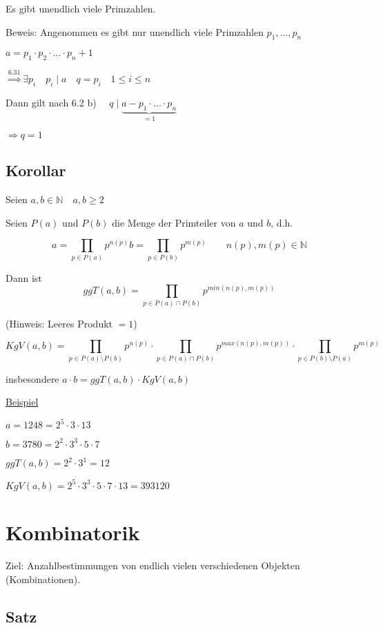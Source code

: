 \documentclass[a4paper, 12pt, twoside] {article}
\begin{document}
Es gibt unendlich viele Primzahlen.

Beweis:	Angenommen es gibt nur unendlich viele Primzahlen $p_1, ..., p_n$

$a = p_1 \cdot p_2 \cdot ... \cdot p_n + 1$

$\overset{6.31}{\Rightarrow} \exists p_i \quad p_i \mid a \quad q = p_i \quad 1 \leq i \leq n$
	
Dann gilt nach 6.2 b) $\quad q \mid \underbrace{a - p_1 \cdot ... \cdot p_n}_{=1}$

$\Rightarrow q = 1$ \Lightning

\subsection{Korollar} %

Seien $a,b \in \mathbb{N} \quad a,b \geq 2$

Seien $P(a)$ und $P(b)$ die Menge der Primteiler von $a$ und $b$, d.h.

$$ a = \prod_{p \in P(a)} p^{n(p)} b = \prod_{p \in P(b)} p^{m(p)}	\qquad n(p), m(p) \in \mathbb{N}$$

Dann ist $$ggT(a,b) = \prod_{p \in P(a) \cap P(b)} p^{min(n(p),m(p))}$$

\hfill (Hinweis: Leeres Produkt $= 1$)
	
$$KgV(a,b) = \prod_{p \in P(a) \setminus P(b)} p^{n(p)} \cdot \prod_{p \in P(a) \cap P(b)} p^{max(n(p),m(p))} \cdot \prod_{p \in P(b) \setminus P(a)} p^{m(p)}$$

insbesondere $a \cdot b = ggT(a,b) \cdot KgV(a,b)$

\underline{Beispiel}

$a = 1248 = 2^5 \cdot 3 \cdot 13$

$b = 3780 = 2^2 \cdot 3^3 \cdot 5 \cdot 7$

$ggT(a,b) = 2^2 \cdot 3^1 = 12$

$KgV(a,b) = 2^5 \cdot 3^3 \cdot 5 \cdot 7 \cdot 13 = 393 120$

\section{Kombinatorik} %

Ziel: Anzahlbestimmungen von endlich vielen verschiedenen Objekten (Kombinationen).

\subsection{Satz} %
\end{document}
